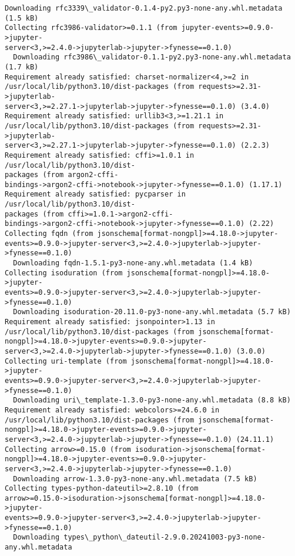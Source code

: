 \documentclass[11pt]{article}
\begin{document}
\begin{Verbatim}[commandchars=\\\{\}]
  Downloading rfc3339\_validator-0.1.4-py2.py3-none-any.whl.metadata (1.5 kB)
Collecting rfc3986-validator>=0.1.1 (from jupyter-events>=0.9.0->jupyter-
server<3,>=2.4.0->jupyterlab->jupyter->fynesse==0.1.0)
  Downloading rfc3986\_validator-0.1.1-py2.py3-none-any.whl.metadata (1.7 kB)
Requirement already satisfied: charset-normalizer<4,>=2 in
/usr/local/lib/python3.10/dist-packages (from requests>=2.31->jupyterlab-
server<3,>=2.27.1->jupyterlab->jupyter->fynesse==0.1.0) (3.4.0)
Requirement already satisfied: urllib3<3,>=1.21.1 in
/usr/local/lib/python3.10/dist-packages (from requests>=2.31->jupyterlab-
server<3,>=2.27.1->jupyterlab->jupyter->fynesse==0.1.0) (2.2.3)
Requirement already satisfied: cffi>=1.0.1 in /usr/local/lib/python3.10/dist-
packages (from argon2-cffi-
bindings->argon2-cffi->notebook->jupyter->fynesse==0.1.0) (1.17.1)
Requirement already satisfied: pycparser in /usr/local/lib/python3.10/dist-
packages (from cffi>=1.0.1->argon2-cffi-
bindings->argon2-cffi->notebook->jupyter->fynesse==0.1.0) (2.22)
Collecting fqdn (from jsonschema[format-nongpl]>=4.18.0->jupyter-
events>=0.9.0->jupyter-server<3,>=2.4.0->jupyterlab->jupyter->fynesse==0.1.0)
  Downloading fqdn-1.5.1-py3-none-any.whl.metadata (1.4 kB)
Collecting isoduration (from jsonschema[format-nongpl]>=4.18.0->jupyter-
events>=0.9.0->jupyter-server<3,>=2.4.0->jupyterlab->jupyter->fynesse==0.1.0)
  Downloading isoduration-20.11.0-py3-none-any.whl.metadata (5.7 kB)
Requirement already satisfied: jsonpointer>1.13 in
/usr/local/lib/python3.10/dist-packages (from jsonschema[format-
nongpl]>=4.18.0->jupyter-events>=0.9.0->jupyter-
server<3,>=2.4.0->jupyterlab->jupyter->fynesse==0.1.0) (3.0.0)
Collecting uri-template (from jsonschema[format-nongpl]>=4.18.0->jupyter-
events>=0.9.0->jupyter-server<3,>=2.4.0->jupyterlab->jupyter->fynesse==0.1.0)
  Downloading uri\_template-1.3.0-py3-none-any.whl.metadata (8.8 kB)
Requirement already satisfied: webcolors>=24.6.0 in
/usr/local/lib/python3.10/dist-packages (from jsonschema[format-
nongpl]>=4.18.0->jupyter-events>=0.9.0->jupyter-
server<3,>=2.4.0->jupyterlab->jupyter->fynesse==0.1.0) (24.11.1)
Collecting arrow>=0.15.0 (from isoduration->jsonschema[format-
nongpl]>=4.18.0->jupyter-events>=0.9.0->jupyter-
server<3,>=2.4.0->jupyterlab->jupyter->fynesse==0.1.0)
  Downloading arrow-1.3.0-py3-none-any.whl.metadata (7.5 kB)
Collecting types-python-dateutil>=2.8.10 (from
arrow>=0.15.0->isoduration->jsonschema[format-nongpl]>=4.18.0->jupyter-
events>=0.9.0->jupyter-server<3,>=2.4.0->jupyterlab->jupyter->fynesse==0.1.0)
  Downloading types\_python\_dateutil-2.9.0.20241003-py3-none-any.whl.metadata

\end{Verbatim}
\end{document}

